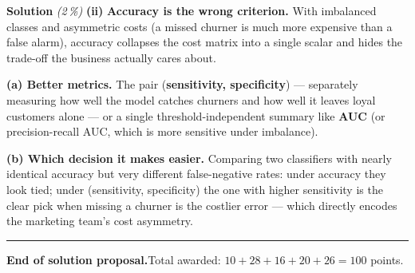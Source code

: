 \documentclass[11pt,a4paper]{article}
\newcommand{\subpoints}[1]{\textit{(#1\,\%)}}
\newcommand{\sol}{\noindent\textbf{Solution}}
\begin{document}
\medskip
\sol{} \subpoints{2} \textbf{(ii)} \textbf{Accuracy is the wrong criterion.} With imbalanced classes
and asymmetric costs (a missed churner is much more expensive than a false alarm), accuracy
collapses the cost matrix into a single scalar and hides the trade-off the business actually cares
about.

\textbf{(a) Better metrics.} The pair (\textbf{sensitivity, specificity}) --- separately measuring
how well the model catches churners and how well it leaves loyal customers alone --- or a single
threshold-independent summary like \textbf{AUC} (or precision-recall AUC, which is more sensitive
under imbalance).

\textbf{(b) Which decision it makes easier.} Comparing two classifiers with nearly identical
accuracy but very different false-negative rates: under accuracy they look tied; under
(sensitivity, specificity) the one with higher sensitivity is the clear pick when missing a churner
is the costlier error --- which directly encodes the marketing team's cost asymmetry.

\vspace{1em}
\hrule
\vspace{0.5em}

\noindent\textbf{End of solution proposal.}\quad Total awarded: $10+28+16+20+26=100$ points.
\end{document}

